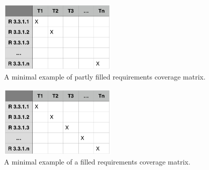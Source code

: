 \documentclass[12pt,titlepage]{article}
\begin{document}
\begin{figure}[H]
	\centering
	\includegraphics[width=0.5\textwidth]{./assets/rcm-incomplete.png}
	\caption{A minimal example of partly filled requirements coverage
		matrix.}
	\label{fig:rcm-incomplete}
\end{figure}

\begin{figure}[H]
	\centering
	\includegraphics[width=0.5\textwidth]{./assets/rcm-filled.png}
	\caption{A minimal example of a filled requirements coverage matrix.}
	\label{fig:rcm-filled}
\end{figure}
\end{document}
